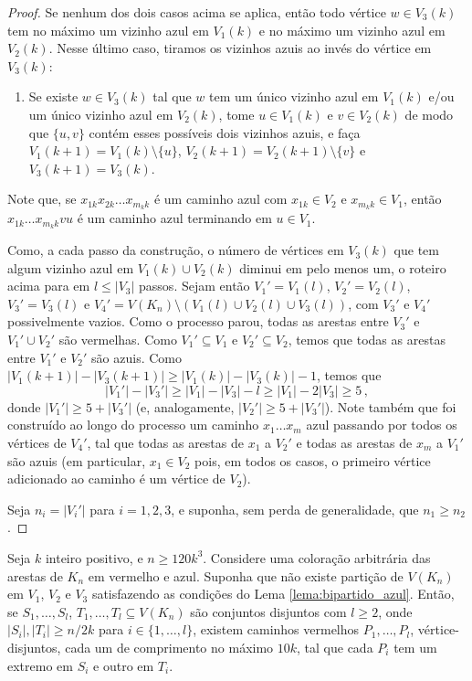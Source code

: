 \begin{proof}
	Se nenhum dos dois casos acima se aplica, então todo vértice $w\in V_3(k)$ tem no máximo um vizinho azul em $V_1(k)$ e no máximo um vizinho azul em $V_2(k)$. Nesse último caso, tiramos os vizinhos azuis ao invés do vértice em $V_3(k)$:
	\begin{enumerate}
		\item Se existe $w\in V_3(k)$ tal que $w$ tem um único vizinho azul em $V_1(k)$ e/ou um único vizinho azul em $V_2(k)$, tome $u\in V_1(k)$ e $v\in V_2(k)$ de modo que $\{u,v\}$ contém esses possíveis dois vizinhos azuis, e faça $V_1(k+1) = V_1(k)\setminus\{u\}$, $V_2(k+1) = V_2(k+1)\setminus\{v\}$ e $V_3(k+1) = V_3(k)$.
	\end{enumerate}
	Note que, se $x_{1k}x_{2k}\dots x_{m_kk}$ é um caminho azul com $x_{1k}\in V_2$ e $x_{m_kk}\in V_1$, então $x_{1k}\dots x_{m_kk}vu$ é um caminho azul terminando em $u\in V_1$.
	
	Como, a cada passo da construção, o número de vértices em $V_3(k)$ que tem algum vizinho azul em $V_1(k)\cup V_2(k)$ diminui em pelo menos um, o roteiro acima para em $l\leq |V_3|$ passos. Sejam então $V_1' = V_1(l)$, $V_2' = V_2(l)$, $V_3' = V_3(l)$ e $V_4' = V(K_n)\setminus (V_1(l)\cup V_2(l)\cup V_3(l))$, com $V_3'$ e $V_4'$ possivelmente vazios. Como o processo parou, todas as arestas entre $V_3'$ e $V_1'\cup V_2'$ são vermelhas. Como $V_1'\subseteq V_1$ e $V_2'\subseteq V_2$, temos que todas as arestas entre $V_1'$ e $V_2'$ são azuis. Como $|V_1(k+1)| - |V_3(k+1)|\geq |V_1(k)| - |V_3(k)| - 1$, temos que 
	\[
		|V_1'| - |V_3'| \geq |V_1| - |V_3| - l \geq |V_1| - 2|V_3| \geq 5\,,
	\]
	donde $|V_1'|\geq 5 + |V_3'|$ (e, analogamente, $|V_2'|\geq 5 + |V_3'|$). Note também que foi construído ao longo do processo um caminho $x_1\dots x_m$ azul passando por todos os vértices de $V_4'$, tal que todas as arestas de $x_1$ a $V_2'$ e todas as arestas de $x_m$ a $V_1'$ são azuis (em particular, $x_1\in V_2$ pois, em todos os casos, o primeiro vértice adicionado ao caminho é um vértice de $V_2$).
	
	Seja $n_i = |V_i'|$ para $i=1,2,3$, e suponha, sem perda de generalidade, que $n_1\geq n_2$.
\end{proof}

\begin{fato}
	Seja $k$ inteiro positivo, e $n\geq 120k^3$. Considere uma coloração arbitrária das arestas de $K_n$ em vermelho e azul. Suponha que não existe partição de $V(K_n)$ em $V_1$, $V_2$ e $V_3$ satisfazendo as condições do Lema \ref{lema:bipartido_azul}. Então, se $S_1, \dots, S_l$, $T_1, \dots, T_l\subseteq V(K_n)$ são conjuntos disjuntos com $l\geq2$, onde $|S_i|, |T_i|\geq n/2k$ para $i\in \{1, \dots, l\}$, existem caminhos vermelhos $P_1, \dots, P_l$, vértice-disjuntos, cada um de comprimento no máximo $10k$, tal que cada $P_i$ tem um extremo em $S_i$ e outro em $T_i$.
\end{fato}

